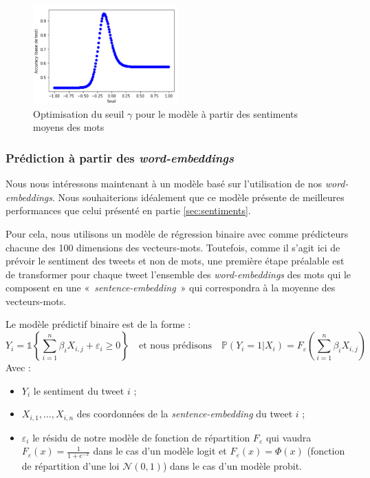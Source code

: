 \documentclass[11pt,french,french]{article}
\begin{document}
\begin{figure}[h]
\begin{center}
\includegraphics[width=0.5\textwidth]{img/max_baseline.png}
\captionsetup{margin=0cm,format=hang,justification=justified}
\caption{Optimisation du seuil $\gamma$ pour le modèle à partir des sentiments moyens des mots}\label{fig:max_baseline}
\end{center}
\end{figure}

\hypertarget{sec:wordembeddings}{%
\subsubsection{\texorpdfstring{Prédiction à partir des \emph{word-embeddings}}{Prédiction à partir des word-embeddings}}\label{sec:wordembeddings}}

Nous nous intéressons maintenant à un modèle basé sur l'utilisation de nos \emph{word-embeddings}.
Nous souhaiterions idéalement que ce modèle présente de meilleures performances que celui présenté en partie \ref{sec:sentiments}.

Pour cela, nous utilisons un modèle de régression binaire avec comme prédicteurs chacune des 100 dimensions des vecteurs-mots.
Toutefois, comme il s'agit ici de prévoir le sentiment des tweets et non de mots, une première étape préalable est de transformer pour chaque tweet l'ensemble des \emph{word-embeddings} des mots qui le composent en une «~\emph{sentence-embedding}~» qui correspondra à la moyenne des vecteurs-mots.

Le modèle prédictif binaire est de la forme :
\[Y_i = \mathds{1}\left\{ \sum_{i = 1}^n \beta_i X_{i,j} + \varepsilon_i \geq 0 \right\} 
\quad \text{et nous prédisons} \quad  \mathbb{P}(Y_i = 1 | X_{i}) = F_{\varepsilon}\left(\sum_{i = 1}^n \beta_i X_{i,j}\right)\]
Avec :

\begin{itemize}
\item $Y_i$ le sentiment du tweet $i$ ;
\item $X_{i,1}, \dots, X_{i,n}$ des coordonnées de la \emph{sentence-embedding} du tweet $i$ ;
\item $\varepsilon_i$ le résidu de notre modèle de fonction de répartition $F_{\varepsilon}$ qui vaudra $F_{\varepsilon}(x) = \frac{1}{1 + e^{-x}}$ dans le cas d'un modèle logit et $F_{\varepsilon}(x) = \Phi(x)$ (fonction de répartition d'une loi $\mathcal{N}(0, 1)$) dans le cas d'un modèle probit. 
\end{itemize}
\end{document}
